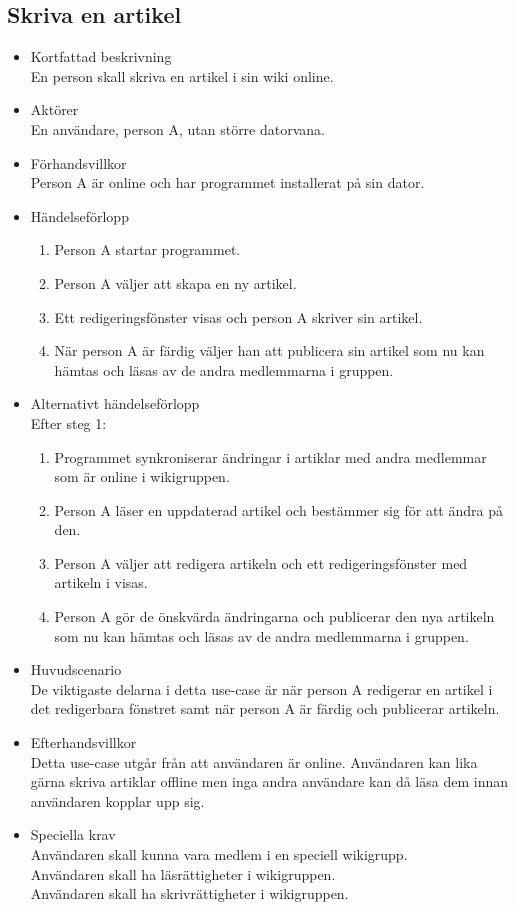 \subsection{Skriva en artikel}
\begin{itemize}
	\item Kortfattad beskrivning
	\\En person skall skriva en artikel i sin wiki online.
	\item Aktörer
	\\En användare, person A, utan större datorvana.
	\item Förhandsvillkor
	\\Person A är online och har programmet installerat på sin dator.
	\item Händelseförlopp
	\begin{enumerate}
		\item Person A startar programmet.
		\item Person A väljer att skapa en ny artikel.
		\item Ett redigeringsfönster visas och person A skriver sin artikel.
		\item När person A är färdig väljer han att publicera sin artikel som nu kan hämtas och läsas av de andra medlemmarna i gruppen.
	\end{enumerate}
	\item Alternativt händelseförlopp
	\\Efter steg 1:
	\begin{enumerate}	
		\item Programmet synkroniserar ändringar i artiklar med andra medlemmar som är online i wikigruppen.
		\item Person A läser en uppdaterad artikel och bestämmer sig för att ändra på den.
		\item Person A väljer att redigera artikeln och ett redigeringsfönster med artikeln i visas.
		\item Person A gör de önskvärda ändringarna	och publicerar den nya artikeln	som nu kan hämtas och läsas av de andra medlemmarna i gruppen.
	\end{enumerate}
	\item Huvudscenario
	\\De viktigaste delarna i detta use-case är när person A redigerar en artikel i det redigerbara fönstret samt när person A är färdig och publicerar artikeln.
	\item Efterhandsvillkor
	\\Detta use-case utgår från att användaren är online. Användaren kan lika gärna skriva artiklar offline men inga  andra användare kan då läsa dem innan användaren kopplar upp sig.
	\item Speciella krav
	\\Användaren skall kunna vara medlem i en speciell wikigrupp.
	\\Användaren skall ha läsrättigheter i wikigruppen.
	\\Användaren skall ha skrivrättigheter i wikigruppen.
\end{itemize}

